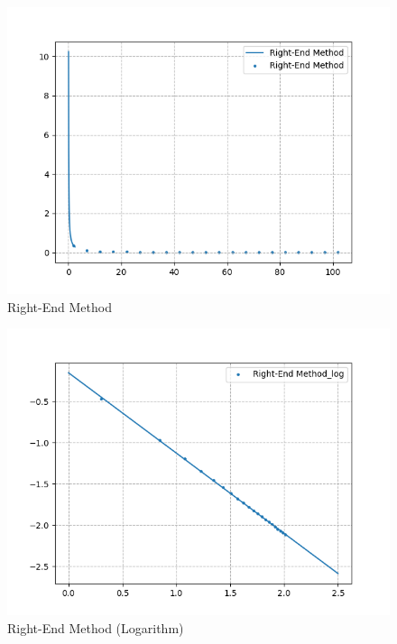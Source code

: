 \documentclass[12pt]{article}
\begin{document}
\begin{figure}[H]
    \centering
    \includegraphics[width=13cm]{right.png}
    \caption{Right-End Method}
\end{figure}

\begin{figure}[H]
    \centering
    \includegraphics[width=13cm]{rightlog.png}
    \caption{Right-End Method (Logarithm)}
\end{figure}
\end{document}
